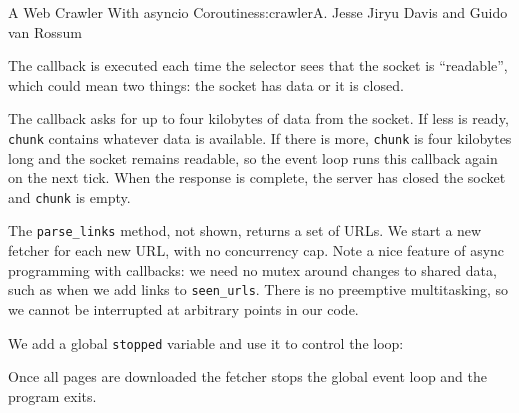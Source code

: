 \begin{aosachapter}{A Web Crawler With asyncio Coroutines}{s:crawler}{A. Jesse Jiryu Davis and Guido van Rossum}
\begin{Shaded}
\begin{Highlighting}[]
             

             
\end{Highlighting}
\end{Shaded}

The callback is executed each time the selector sees that the socket is
``readable'', which could mean two things: the socket has data or it is
closed.

The callback asks for up to four kilobytes of data from the socket. If
less is ready, \texttt{chunk} contains whatever data is available. If
there is more, \texttt{chunk} is four kilobytes long and the socket
remains readable, so the event loop runs this callback again on the next
tick. When the response is complete, the server has closed the socket
and \texttt{chunk} is empty.

The \texttt{parse\_links} method, not shown, returns a set of URLs. We
start a new fetcher for each new URL, with no concurrency cap. Note a
nice feature of async programming with callbacks: we need no mutex
around changes to shared data, such as when we add links to
\texttt{seen\_urls}. There is no preemptive multitasking, so we cannot
be interrupted at arbitrary points in our code.

We add a global \texttt{stopped} variable and use it to control the
loop:

\begin{Shaded}
\begin{Highlighting}[]

 
     
         
\end{Highlighting}
\end{Shaded}

Once all pages are downloaded the fetcher stops the global event loop
and the program exits.


\end{aosachapter}
